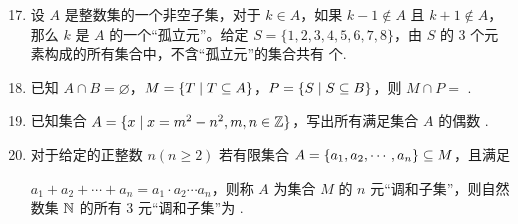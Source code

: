 \documentclass[a4paper,11pt]{article}
\begin{document}
\begin{enumerate}
\setcounter{enumi}{16}

\item 设 $A$ 是整数集的一个非空子集，对于 $k\in A$，如果 $k-1\notin A$ 且 $k+1\notin A$，那么 $k$ 是 $A$ 的一个“孤立元”。给定 $S=\{1,2,3,4,5,6,7,8\}$，由 $S$ 的 3 个元素构成的所有集合中，不含“孤立元”的集合共有 \blankline[2.4em] 个.

\ifanswer
\solbegin
{}
\solend

\fi

\item 已知 $A\cap B=\varnothing$，$M=\{T\mid T\subseteq A\}$，$P=\{S\mid S\subseteq B\}$，则 $M\cap P=$ \blankline[4.4em].

\ans{$\{\varnothing\}$}

\item 已知集合 $A=\{x\mid x=m^2-n^2,m,n\in\mathbb{Z}\}$，写出所有满足集合 $A$ 的偶数 \blankline[4.4em].


\item 对于给定的正整数 $n(n\geqslant 2)$ 若有限集合 $A=\{a_1,a_2,\cdots,a_n\}\subseteq M$，且满足

$a_1+a_2+\cdots+a_n=a_1\cdot a_2\cdots a_n$，则称 $A$ 为集合 $M$ 的 $n$ 元“调和子集”，则自然数集 $\mathbb{N}$ 的所有 3 元“调和子集”为 \blankline[3.6em].


\end{enumerate}
\end{document}
